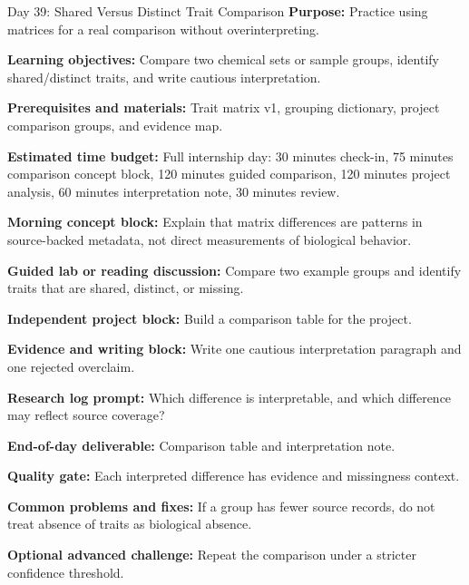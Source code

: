 \begin{dailybox}{Day 39: Shared Versus Distinct Trait Comparison}
\textbf{Purpose:} Practice using matrices for a real comparison without overinterpreting.

\textbf{Learning objectives:} Compare two chemical sets or sample groups, identify shared/distinct traits, and write cautious interpretation.

\textbf{Prerequisites and materials:} Trait matrix v1, grouping dictionary, project comparison groups, and evidence map.

\textbf{Estimated time budget:} Full internship day: 30 minutes check-in, 75 minutes comparison concept block, 120 minutes guided comparison, 120 minutes project analysis, 60 minutes interpretation note, 30 minutes review.

\textbf{Morning concept block:} Explain that matrix differences are patterns in source-backed metadata, not direct measurements of biological behavior.

\textbf{Guided lab or reading discussion:} Compare two example groups and identify traits that are shared, distinct, or missing.

\textbf{Independent project block:} Build a comparison table for the project.

\textbf{Evidence and writing block:} Write one cautious interpretation paragraph and one rejected overclaim.

\textbf{Research log prompt:} Which difference is interpretable, and which difference may reflect source coverage?

\textbf{End-of-day deliverable:} Comparison table and interpretation note.

\textbf{Quality gate:} Each interpreted difference has evidence and missingness context.

\textbf{Common problems and fixes:} If a group has fewer source records, do not treat absence of traits as biological absence.

\textbf{Optional advanced challenge:} Repeat the comparison under a stricter confidence threshold.
\end{dailybox}

